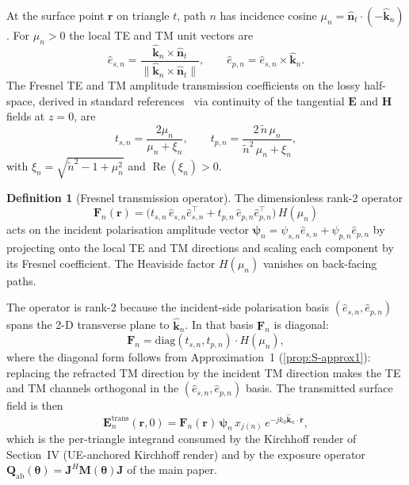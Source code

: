 \documentclass[10pt,journal,twocolumn]{IEEEtran}
\newcommand{\rr}{\bm{r}}
\newcommand{\nhat}{\hat{\bm{n}}}
\newcommand{\khat}{\hat{\bm{k}}}
\newcommand{\Qabs}{\mathbf{Q}_{\mathrm{ab}}}
\newcommand{\Jmat}{\mathbf{J}}
\newcommand{\Fn}{\mathbf{F}_n}
\newcommand{\psin}{\bm{\psi}_n}
\newcommand{\thetab}{\bm{\theta}}
\newcommand{\ntilde}{\tilde{n}}
\DeclareMathOperator{\RE}{Re}
\theoremstyle{plain}
\theoremstyle{definition}
\newtheorem{definition}[proposition]{Definition}
\begin{document}
At the surface point $\rr$ on triangle $t$, path $n$ has incidence
cosine $\mu_n = \nhat_t \cdot (-\khat_n)$. For $\mu_n > 0$ the local
TE and TM unit vectors are
\begin{equation}\label{eq:S-TE-TM-basis}
  \hat{e}_{s,n} = \frac{\khat_n \times \nhat_t}
                       {\|\khat_n \times \nhat_t\|},
  \qquad
  \hat{e}_{p,n} = \hat{e}_{s,n} \times \khat_n.
\end{equation}
The Fresnel TE and TM amplitude transmission coefficients on the
lossy half-space, derived in standard references~\cite{BornWolf} via
continuity of the tangential $\bm{E}$ and $\bm{H}$ fields at $z=0$,
are
\begin{equation}\label{eq:S-fresnel-t}
  t_{s,n} = \frac{2 \mu_n}{\mu_n + \xi_n},
  \qquad
  t_{p,n} = \frac{2\,\ntilde\,\mu_n}{\ntilde^2\,\mu_n + \xi_n},
\end{equation}
with $\xi_n = \sqrt{\ntilde^2 - 1 + \mu_n^2}$ and $\RE(\xi_n) > 0$.

\begin{definition}[Fresnel transmission operator]\label{def:S-Fn}
The dimensionless rank-2 operator
\begin{equation}\label{eq:S-Fn-def}
  \Fn(\rr) =
  \bigl(t_{s,n}\,\hat{e}_{s,n}\hat{e}_{s,n}^{\!\top}
      + t_{p,n}\,\hat{e}_{p,n}\hat{e}_{p,n}^{\!\top}\bigr)\,H(\mu_n)
\end{equation}
acts on the incident polarisation amplitude vector
$\psin = \psi_{s,n}\hat{e}_{s,n} + \psi_{p,n}\hat{e}_{p,n}$ by
projecting onto the local TE and TM directions and scaling each
component by its Fresnel coefficient. The Heaviside factor
$H(\mu_n)$ vanishes on back-facing paths.
\end{definition}

The operator is rank-2 because the incident-side polarisation basis
$(\hat{e}_{s,n}, \hat{e}_{p,n})$ spans the 2-D transverse plane to
$\khat_n$. In that basis $\Fn$ is diagonal:
\begin{equation}\label{eq:S-Fn-diag}
  \Fn = \mathrm{diag}(t_{s,n}, t_{p,n}) \cdot H(\mu_n),
\end{equation}
where the diagonal form follows from Approximation~1
(\cref{prop:S-approx1}): replacing the refracted TM direction by the
incident TM direction makes the TE and TM channels orthogonal in the
$(\hat{e}_{s,n}, \hat{e}_{p,n})$ basis. The transmitted surface
field is then
\begin{equation}\label{eq:S-Etrans}
  \bm{E}_n^{\mathrm{trans}}(\rr, 0)
    = \Fn(\rr)\,\psin\,x_{j(n)}\,e^{-jk_0\khat_n\cdot\rr},
\end{equation}
which is the per-triangle integrand consumed by the Kirchhoff render
of Section~IV (UE-anchored Kirchhoff render) and by the exposure
operator $\Qabs(\thetab) = \Jmat^{H}\mathbf{M}(\thetab)\Jmat$ of
the main paper.
\end{document}
